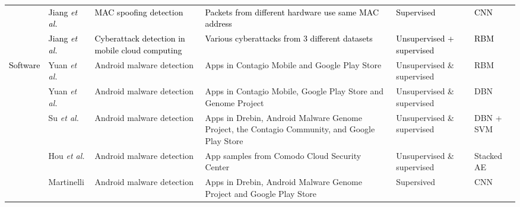 \documentclass[journal,comsoc,letter]{IEEEtran}
\newcommand{\edit}[1]{\textcolor{black}{#1}}
\newcommand{\rev}[1]{\textcolor{black}{#1}}
\begin{document}
\begin{table*}[h!]
\begin{tabular}{|c|C{2.1cm}|C{3.3cm}|C{6cm}|C{1.7cm}|C{1.7cm}|}
                                      & \edit{Jiang \emph{et al.} \cite{jiang2018virtual}}         & \edit{MAC spoofing detection}                                & \edit{Packets from different hardware use same MAC address} & \edit{Supervised}            & \edit{CNN}                                                 \\  
                                      & \rev{Jiang \emph{et al.} \cite{nguyen2018cyberattack}}         & \rev{Cyberattack detection in mobile cloud computing}                                & \rev{Various cyberattacks from 3 different datasets} & \rev{Unsupervised + supervised}            & \rev{RBM}                                                 \\ \hline
\multirow{12}{*}{\edit{Software}}       & Yuan \emph{et al.} \cite{yuan2014droid}                  & Android malware detection                                       & Apps in Contagio Mobile and Google Play Store                                                                                         & Unsupervised \& supervised & RBM                                                      \\  
                                      & Yuan \emph{et al.} \cite{yuan2016droiddetector}          & Android malware detection                                       & Apps in Contagio Mobile, Google Play Store and Genome Project                                                                      & Unsupervised \& supervised & DBN                                                      \\  
                                      & Su \emph{et al.} \cite{su2016deep}                       & Android malware detection                                       & Apps in Drebin, Android Malware Genome Project, the Contagio Community, and Google Play Store                                       & Unsupervised \& supervised & DBN + SVM                                                \\  
                                      & Hou \emph{et al.} \cite{hou2016deep4maldroid}            & Android malware detection                                       & App samples from Comodo Cloud Security Center                                                                                         & Unsupervised \& supervised & Stacked AE                                               \\  
                                      & Martinelli \cite{martinelli2017evaluating}               & Android malware detection                                       & Apps in Drebin, Android Malware Genome Project and Google Play Store                                                                  & Supersived                 & CNN                                                      \\  

\end{tabular}
\end{table*}
\end{document}
